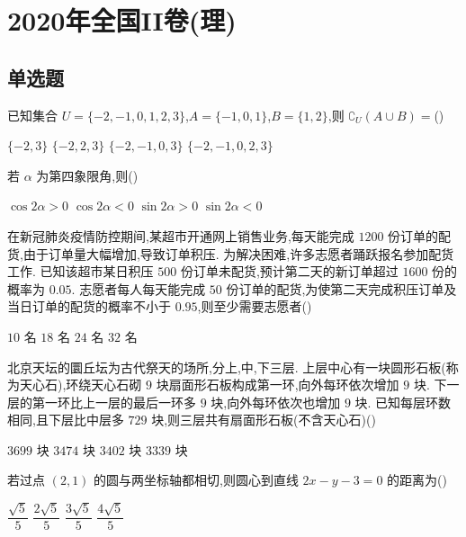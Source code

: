 \chapter{2020年全国II卷(理)}

\section{单选题}

\begin{problem}
已知集合 \(U=\{-2,-1,0,1,2,3\}\),\(A=\{-1,0,1\}\),\(B=\{1,2\}\),则 \(\complement_U\left( A\cup B \right)=\)(\quad)

\choices
    {\(\{-2,3\}\)}
    {\(\{-2,2,3\}\)}
    {\(\{-2,-1,0,3\}\)}
    {\(\{-2,-1,0,2,3\}\)}
\end{problem}

\begin{problem}
若 \(\alpha\) 为第四象限角,则(\quad)

\choices
    {\(\cos 2\alpha>0\)}
    {\(\cos 2\alpha<0\)}
    {\(\sin 2\alpha>0\)}
    {\(\sin 2\alpha<0\)}
\end{problem}

\begin{problem}
在新冠肺炎疫情防控期间,某超市开通网上销售业务,每天能完成 \(1200\) 份订单的配货,由于订单量大幅增加,导致订单积压. 为解决困难,许多志愿者踊跃报名参加配货工作. 已知该超市某日积压 \(500\) 份订单未配货,预计第二天的新订单超过 \(1600\) 份的概率为 \(0.05\). 志愿者每人每天能完成 \(50\) 份订单的配货,为使第二天完成积压订单及当日订单的配货的概率不小于 \(0.95\),则至少需要志愿者(\quad)

\choices
    {\(10\) 名}
    {\(18\) 名}
    {\(24\) 名}
    {\(32\) 名}
\end{problem}

\begin{problem}
北京天坛的圜丘坛为古代祭天的场所,分上,中,下三层. 上层中心有一块圆形石板(称为天心石),环绕天心石砌 \(9\) 块扇面形石板构成第一环,向外每环依次增加 \(9\) 块. 下一层的第一环比上一层的最后一环多 \(9\) 块,向外每环依次也增加 \(9\) 块. 已知每层环数相同,且下层比中层多 \(729\) 块,则三层共有扇面形石板(不含天心石)(\quad)

\choices
    {\(3699\) 块}
    {\(3474\) 块}
    {\(3402\) 块}
    {\(3339\) 块}
\end{problem}

\begin{problem}
若过点 \((2,1)\) 的圆与两坐标轴都相切,则圆心到直线 \(2x-y-3=0\) 的距离为(\quad)

\choices
    {\(\dfrac{\sqrt5}{5}\)}
    {\(\dfrac{2\sqrt5}{5}\)}
    {\(\dfrac{3\sqrt5}{5}\)}
    {\(\dfrac{4\sqrt5}{5}\)}
\end{problem}

